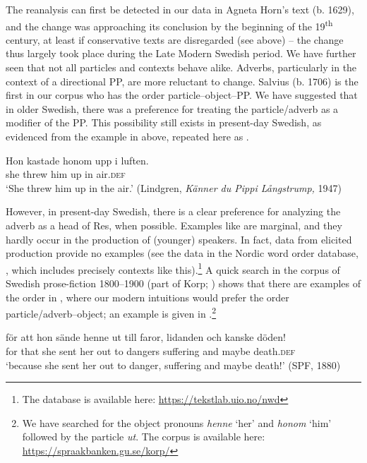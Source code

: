 \documentclass[output=paper]{langscibook}
\begin{document}
The reanalysis can first be detected in our data in Agneta Horn’s text (b. 1629), and the change was approaching its conclusion by the beginning of the 19\textsuperscript{th} century, at least if conservative texts are disregarded (see  above) – the change thus largely took place during the Late Modern Swedish period. We have further seen that not all particles and contexts behave alike. Adverbs, particularly in the context of a directional PP, are more reluctant to change. Salvius (b. 1706) is the first in our corpus who has the order particle–object–PP. We have suggested that in older Swedish, there was a preference for treating the particle/adverb as a modifier of the PP. This possibility still exists in present-day Swedish, as evidenced from the example in  above, repeated here as .


\ea\label{ex:lalu:64}
\gll  Hon    kastade   honom   upp     i   luften.\\
she       threw     him     up     in   air.\textsc{def}\\
\glt `She threw him up in the air.’ (Lindgren, \textit{Känner du Pippi Långstrump,} 1947)\\
\z


However, in present-day Swedish, there is a clear preference for analyzing the adverb as a head of Res, when possible. Examples like  are marginal, and they hardly occur in the production of (younger) speakers. In fact, data from elicited production provide no examples (see the data in the Nordic word order database, \citealt{LundquistEtAl2019}, which includes precisely contexts like this).\footnote{The database is available here: \url{https://tekstlab.uio.no/nwd}}  A quick search in the corpus of Swedish prose-fiction 1800–1900 (part of Korp; \citealt{BorinEtAl2012}) shows that there are examples of the order in , where our modern intuitions would prefer the order particle/adverb–object; an example is given in .\footnote{We have searched for the object pronouns \textit{henne} ‘her’ and \textit{honom} ‘him’ followed by the particle \textit{ut}. The corpus is available here: \url{https://spraakbanken.gu.se/korp/}}


\ea\label{ex:lalu:65}
\gll  för   att   hon   sände   henne   ut     till   faror, lidanden   och  kanske   döden!\\
for   that     she   sent     her   out     to   dangers suffering   and   maybe   death.\textsc{def}\\
\glt `because she sent her out to danger, suffering and maybe death!’ (SPF, 1880)\\
\z
\end{document}
